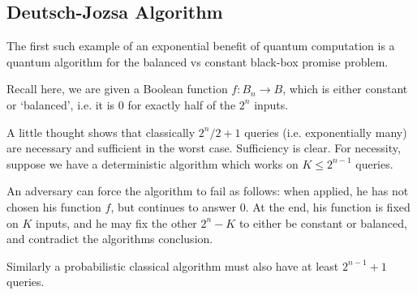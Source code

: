 \documentclass[12pt]{article}
\begin{document}
\subsection{Deutsch-Jozsa Algorithm}
\label{sub:dja}

The first such example of an exponential benefit of quantum computation is a quantum algorithm for the balanced vs constant black-box promise problem.

Recall here, we are given a Boolean function $f : B_n \to B$, which is either constant or `balanced', i.e. it is $0$ for exactly half of the $2^n$ inputs.

A little thought shows that classically $2^{n}/2 + 1$ queries (i.e. exponentially many) are necessary and sufficient in the worst case. Sufficiency is clear. For necessity, suppose we have a deterministic algorithm which works on $K \leq 2^{n-1}$ queries.

An adversary can force the algorithm to fail as follows: when applied, he has not chosen his function $f$, but continues to answer $0$. At the end, his function is fixed on $K$ inputs, and he may fix the other $2^n - K$ to either be constant or balanced, and contradict the algorithms conclusion.

Similarly a probabilistic classical algorithm must also have at least $2^{n-1} + 1$ queries.
\end{document}
